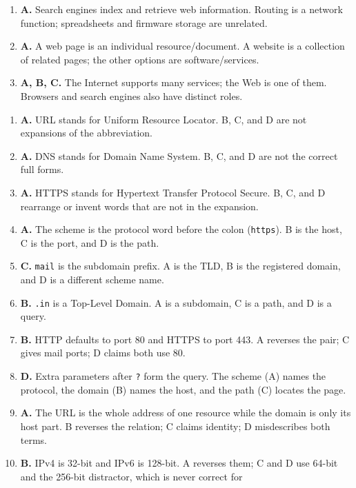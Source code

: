 \begin{enumerate}[label=\textbf{Q\arabic*.}, leftmargin=*]
\item \textbf{A.} Search engines index and retrieve web information. Routing is a network function; spreadsheets and firmware storage are unrelated.

\item \textbf{A.} A web page is an individual resource/document. A website is a collection of related pages; the other options are software/services.

\item \textbf{A, B, C.} The Internet supports many services; the Web is one of them. Browsers and search engines also have distinct roles.

\end{enumerate}
\begin{enumerate}[label=\textbf{Q\arabic*.}, leftmargin=*]
\item \textbf{A.} URL stands for Uniform Resource Locator. B, C, and D are
  not expansions of the abbreviation.
\item \textbf{A.} DNS stands for Domain Name System. B, C, and D are not the
  correct full forms.
\item \textbf{A.} HTTPS stands for Hypertext Transfer Protocol Secure. B,
  C, and D rearrange or invent words that are not in the expansion.
\item \textbf{A.} The scheme is the protocol word before the colon
  (\texttt{https}). B is the host, C is the port, and D is the path.
\item \textbf{C.} \texttt{mail} is the subdomain prefix. A is the TLD, B
  is the registered domain, and D is a different scheme name.
\item \textbf{B.} \texttt{.in} is a Top-Level Domain. A is a subdomain, C
  is a path, and D is a query.
\item \textbf{B.} HTTP defaults to port 80 and HTTPS to port 443. A reverses
  the pair; C gives mail ports; D claims both use 80.
\item \textbf{D.} Extra parameters after \texttt{?} form the query. The
  scheme (A) names the protocol, the domain (B) names the host, and the
  path (C) locates the page.
\item \textbf{A.} The URL is the whole address of one resource while the
  domain is only its host part. B reverses the relation; C claims identity;
  D misdescribes both terms.
\item \textbf{B.} IPv4 is 32-bit and IPv6 is 128-bit. A reverses them; C
  and D use 64-bit and the 256-bit distractor, which is never correct for

\end{enumerate}
